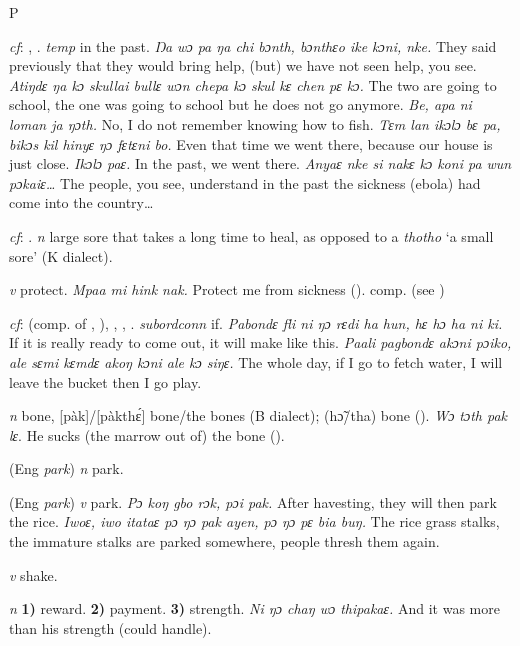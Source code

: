 \begin{letter}{P}

 \textit{cf}: , . \textit{temp} in the past. \textit{Ŋa wɔ pa ŋa chi bɔnth, bɔnthɛo ike kɔni, nke.} They said previously that they would bring help, (but) we have not seen help, you see. \textit{Atiŋdɛ ŋa kɔ skullai bullɛ wɔn chepa kɔ skul kɛ chen pɛ kɔ.} The two are going to school, the one was going to school but he does not go anymore. \textit{Be, apa ni loman ja ŋɔth.} No, I do not remember knowing how to fish. \textit{Tɛm lan ikɔlɔ bɛ pa, bikɔs kil hinyɛ ŋɔ fɛtɛni bo.} Even that time we went there, because our house is just close. \textit{Ikɔlɔ paɛ.} In the past, we went there. \textit{Anyaɛ nke si nakɛ kɔ koni pa wun pɔkaiɛ…} The people, you see, understand in the past the sickness (ebola) had come into the country…

 \textit{cf}: . \textit{n} large sore that takes a long time to heal, as opposed to a \textit{thotho} ‘a small sore' (K dialect). 

 \textit{v} protect. \textit{Mpaa mi hink nak.} Protect me from sickness (\citealt{Pichl1967}). comp.  (see ) 

 \textit{cf}:  (comp. of , ), , , . \textit{subordconn} if. \textit{Pabondɛ fli ni ŋɔ rɛdi ha hun, hɛ hɔ ha ni ki.} If it is really ready to come out, it will make like this. \textit{Paali pagbondɛ akɔni pɔiko, ale sɛmi kɛmdɛ akoŋ kɔni ale kɔ siŋɛ.} The whole day, if I go to fetch water, I will leave the bucket then I go play.

 \textit{n} bone, [pàk]/[pàkthɛ́] bone/the bones (B dialect); (hɔ̃/tha) bone (\citealt{Pichl1967}). \textit{Wɔ tɔth pak lɛ}. He sucks (the marrow out of) the bone (\citealt{Pichl1967}).

 (Eng \textit{park}) \textit{n} park.

 (Eng \textit{park}) \textit{v} park. \textit{Pɔ koŋ gbo rɔk, pɔi pak.} After havesting, they will then park the rice. \textit{Iwoɛ, iwo itataɛ pɔ ŋɔ pak ayen, pɔ ŋɔ pɛ bia buŋ.} The rice grass stalks, the immature stalks are parked somewhere, people thresh them again. 

 \textit{v} shake.

 \textit{n} \textbf{1)} reward. \textbf{2)} payment. \textbf{3)} strength. \textit{Ni ŋɔ chaŋ wɔ thipakaɛ.} And it was more than his strength (could handle). 


\end{letter}
